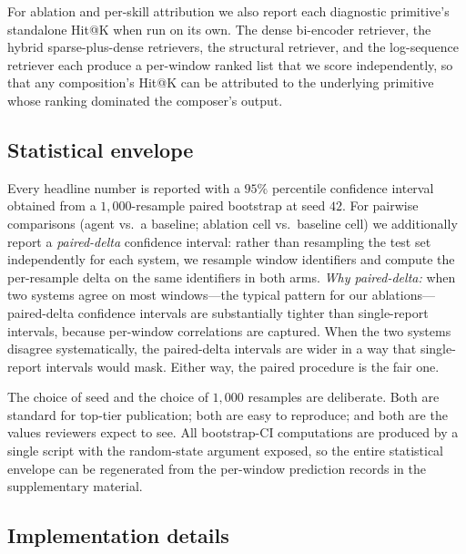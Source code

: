  For ablation and per-skill attribution we also report each diagnostic primitive's standalone Hit@K when run on its own. The dense bi-encoder retriever, the hybrid sparse-plus-dense retrievers, the structural retriever, and the log-sequence retriever each produce a per-window ranked list that we score independently, so that any composition's Hit@K can be attributed to the underlying primitive whose ranking dominated the composer's output.

\subsection{Statistical envelope}
\label{sec:evaluation:stats}

Every headline number is reported with a $95\%$ percentile confidence interval obtained from a $1{,}000$-resample paired bootstrap at seed $42$. For pairwise comparisons (agent vs.\ a baseline; ablation cell vs.\ baseline cell) we additionally report a \emph{paired-delta} confidence interval: rather than resampling the test set independently for each system, we resample window identifiers and compute the per-resample delta on the same identifiers in both arms. \emph{Why paired-delta:} when two systems agree on most windows---the typical pattern for our ablations---paired-delta confidence intervals are substantially tighter than single-report intervals, because per-window correlations are captured. When the two systems disagree systematically, the paired-delta intervals are wider in a way that single-report intervals would mask. Either way, the paired procedure is the fair one.

The choice of seed and the choice of $1{,}000$ resamples are deliberate. Both are standard for top-tier publication; both are easy to reproduce; and both are the values reviewers expect to see. All bootstrap-CI computations are produced by a single script with the random-state argument exposed, so the entire statistical envelope can be regenerated from the per-window prediction records in the supplementary material.

\subsection{Implementation details}
\label{sec:evaluation:impl}


